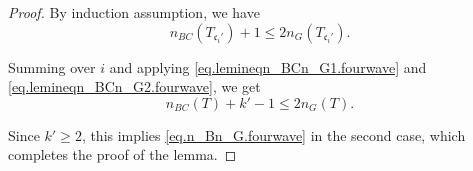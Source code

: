 \begin{proof}
By induction assumption, we have
\begin{equation}
 n_{BC}(T_{\mathfrak{c}_i'}) + 1 \le 2n_{G}(T_{\mathfrak{c}_i'}).
\end{equation}

Summing over $i$ and applying \eqref{eq.lemineqn_BCn_G1.fourwave} and \eqref{eq.lemineqn_BCn_G2.fourwave}, we get 
\begin{equation}
 n_{BC}(T) + k' - 1 \le 2n_{G}(T).
\end{equation}

Since $k'\ge 2$, this implies \eqref{eq.n_Bn_G.fourwave} in the second case, which completes the proof of the lemma.
\end{proof}





